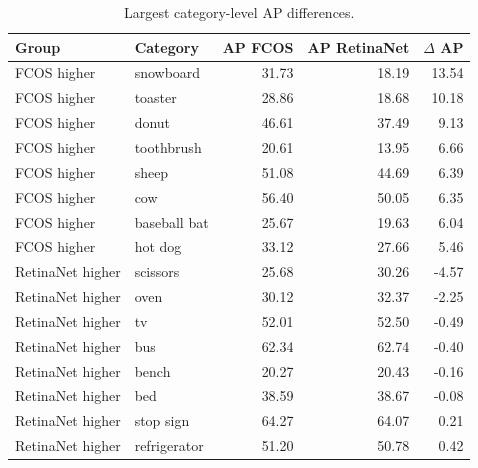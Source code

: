 \begin{table}[t]
\centering
\caption{Largest category-level AP differences.}
\label{tab:per-class-delta}
\begin{tabular}{llrrr}
\toprule
Group & Category & AP FCOS & AP RetinaNet & $\Delta$ AP \\
\midrule
FCOS higher & snowboard & 31.73 & 18.19 & 13.54 \\
FCOS higher & toaster & 28.86 & 18.68 & 10.18 \\
FCOS higher & donut & 46.61 & 37.49 & 9.13 \\
FCOS higher & toothbrush & 20.61 & 13.95 & 6.66 \\
FCOS higher & sheep & 51.08 & 44.69 & 6.39 \\
FCOS higher & cow & 56.40 & 50.05 & 6.35 \\
FCOS higher & baseball bat & 25.67 & 19.63 & 6.04 \\
FCOS higher & hot dog & 33.12 & 27.66 & 5.46 \\
RetinaNet higher & scissors & 25.68 & 30.26 & -4.57 \\
RetinaNet higher & oven & 30.12 & 32.37 & -2.25 \\
RetinaNet higher & tv & 52.01 & 52.50 & -0.49 \\
RetinaNet higher & bus & 62.34 & 62.74 & -0.40 \\
RetinaNet higher & bench & 20.27 & 20.43 & -0.16 \\
RetinaNet higher & bed & 38.59 & 38.67 & -0.08 \\
RetinaNet higher & stop sign & 64.27 & 64.07 & 0.21 \\
RetinaNet higher & refrigerator & 51.20 & 50.78 & 0.42 \\
\bottomrule
\end{tabular}
\end{table}
